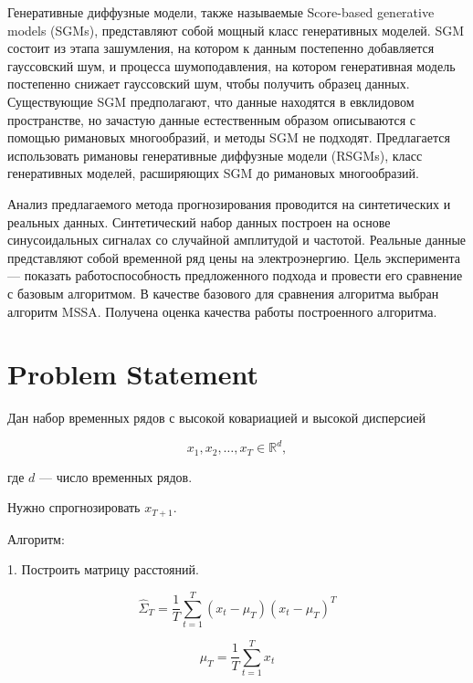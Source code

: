 \documentclass{article}
\begin{document}
Генеративные диффузные модели, также называемые Score-based generative models (SGMs), представляют собой мощный класс генеративных моделей. SGM состоит из этапа зашумления, на котором к данным постепенно добавляется гауссовский шум, и процесса шумоподавления, на котором генеративная модель постепенно снижает гауссовский шум, чтобы получить образец данных. Существующие SGM предполагают, что данные находятся в евклидовом пространстве, но зачастую данные естественным образом описываются с помощью римановых многообразий, и методы SGM не подходят. Предлагается использовать римановы генеративные диффузные модели (RSGMs), класс генеративных моделей, расширяющих SGM до римановых многообразий.

Анализ предлагаемого метода прогнозирования проводится на синтетических и реальных данных. Синтетический набор данных построен на основе синусоидальных сигналах со случайной амплитудой и частотой. Реальные данные представляют собой временной ряд цены на электроэнергию. Цель эксперимента — показать работоспособность предложенного подхода и провести его сравнение с базовым алгоритмом. В качестве базового для сравнения алгоритма выбран алгоритм MSSA. Получена оценка качества работы построенного алгоритма.

\section{Problem Statement}
\label{sec:headings}

Дан набор временных рядов с высокой ковариацией и высокой дисперсией


\begin{equation}
	x_1, x_2, \ldots, x_T \in \mathbb{R}^d,
\end{equation}

где $d$ — число временных рядов.

Нужно спрогнозировать $x_{T+1}$.

Алгоритм:

1. Построить матрицу расстояний.

\begin{equation}
\hat{\Sigma}_T = \frac{1}{T} \sum_{t=1}^{T} (x_t - \mu_T)(x_t - \mu_T)^T
\end{equation}

\begin{equation}
\mu_T = \frac{1}{T} \sum_{t=1}^{T} x_t
\end{equation}
\end{document}
